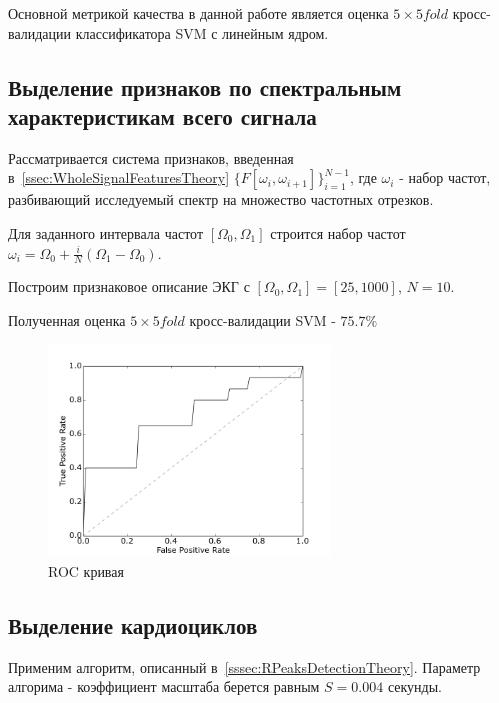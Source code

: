 \documentclass[a4paper,12pt]{extarticle}
\begin{document}
Основной метрикой качества в данной работе является оценка $5\times5 fold$ кросс-валидации классификатора SVM с линейным ядром.

\subsection{Выделение признаков по спектральным характеристикам всего сигнала}

Рассматривается система признаков, введенная в~\ref{ssec:WholeSignalFeaturesTheory} $\{F[\omega_{i},\omega_{i+1}]\}_{i=1}^{N-1}$, где $\omega_i$ - набор частот, разбивающий исследуемый спектр на множество частотных отрезков. 

Для заданного интервала частот $[\Omega_0, \Omega_1]$ строится набор частот $\omega_i = \Omega_0 +  \frac{i}{N} (\Omega_1 - \Omega_0)$.

Построим признаковое описание ЭКГ с $[\Omega_0, \Omega_1] = [25, 1000]$, $N=10$.

Полученная оценка $5\times5 fold$ кросс-валидации SVM - $75.7\%$

\begin{figure}[H]
    \begin{center}
       \includegraphics[width=75mm]{img/old_roc.png}
    \end{center}
    \caption{ROC кривая}
\end{figure}

\subsection{Выделение кардиоциклов}

Применим алгоритм, описанный в~\ref{sssec:RPeaksDetectionTheory}.
Параметр алгорима - коэффициент масштаба берется равным $S = 0.004$ секунды.
\end{document}
